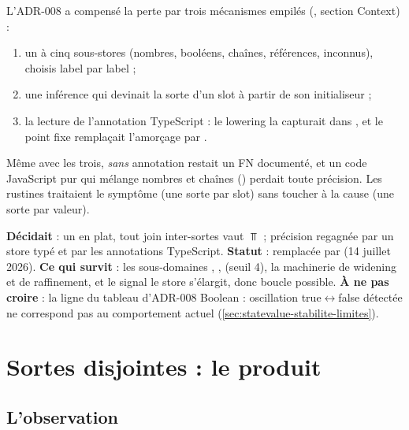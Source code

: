 L'ADR-008 a compensé la perte par trois mécanismes empilés
(, section \og Context\fg{}) :
\begin{enumerate}
  \item un  à cinq sous-stores (nombres, booléens,
    chaînes, références, inconnus), choisis label par label ;
  \item une inférence  qui devinait la sorte d'un
    slot à partir de son initialiseur ;
  \item la lecture de l'annotation TypeScript  :
    le lowering la capturait dans , et le
    point fixe remplaçait l'amorçage  par .
\end{enumerate}
Même avec les trois,  \emph{sans} annotation restait un
FN documenté, et un code JavaScript pur qui mélange nombres et chaînes
() perdait toute précision. Les rustines
traitaient le symptôme (une sorte par slot) sans toucher à la cause (une
sorte par valeur).

\begin{decision}
\textbf{Décidait} : un  en  plat, tout join
inter-sortes vaut $\Top$ ; précision regagnée par un store typé et par les
annotations TypeScript. \textbf{Statut} : remplacée par 
(14 juillet 2026). \textbf{Ce qui survit} : les sous-domaines
, ,  (seuil 4), la machinerie de
widening et de raffinement, et le signal \og le store s'élargit, donc boucle
possible\fg{}. \textbf{À ne pas croire} : la ligne du tableau d'ADR-008
\og Boolean : oscillation true$\leftrightarrow$false détectée\fg{} ne
correspond pas au comportement actuel (\cref{sec:statevalue-stabilite-limites}).
\end{decision}

\section{Sortes disjointes : le produit }
\label{sec:statevalue-stabilite-produit}

\subsection{L'observation}

